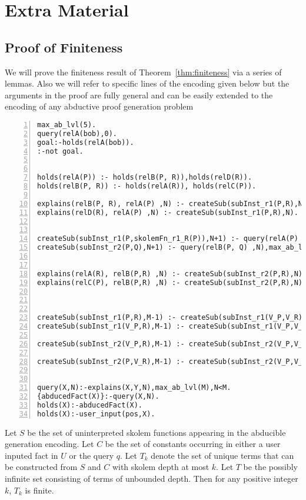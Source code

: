 \section{Extra Material}

\subsection{Proof of Finiteness}\label{sec:proof_finiteness}

We will prove the finiteness result of Theorem~\ref{thm:finiteness} via a series of lemmas. Also we will refer to specific lines of the encoding given below but the arguments in the proof are fully general and can be easily extended to the encoding of any abductive proof generation problem

\begin{lstlisting}[numbers=left]
max_ab_lvl(5).
query(relA(bob),0).
goal:-holds(relA(bob)).
:-not goal.


holds(relA(P)) :- holds(relB(P, R)),holds(relD(R)).
holds(relB(P, R)) :- holds(relA(R)), holds(relC(P)).

explains(relB(P, R), relA(P) ,N) :- createSub(subInst_r1(P,R),N).
explains(relD(R), relA(P) ,N) :- createSub(subInst_r1(P,R),N).


createSub(subInst_r1(P,skolemFn_r1_R(P)),N+1) :- query(relA(P) ,N),max_ab_lvl(M),N<M-1.
createSub(subInst_r2(P,Q),N+1) :- query(relB(P, Q) ,N),max_ab_lvl(M),N<M-1.


explains(relA(R), relB(P,R) ,N) :- createSub(subInst_r2(P,R),N).
explains(relC(P), relB(P,R) ,N) :- createSub(subInst_r2(P,R),N).



createSub(subInst_r1(P,R),M-1) :- createSub(subInst_r1(V_P,V_R),N), holds(relB(P, R)),max_ab_lvl(M).
createSub(subInst_r1(V_P,R),M-1) :- createSub(subInst_r1(V_P,V_R),N), holds(relD(R)),max_ab_lvl(M).

createSub(subInst_r2(V_P,R),M-1) :- createSub(subInst_r2(V_P,V_R),N), holds(relA(R)),max_ab_lvl(M).

createSub(subInst_r2(P,V_R),M-1) :- createSub(subInst_r2(V_P,V_R),N), holds(relC(P)),max_ab_lvl(M).


query(X,N):-explains(X,Y,N),max_ab_lvl(M),N<M.
{abducedFact(X)}:-query(X,N).
holds(X):-abducedFact(X).
holds(X):-user_input(pos,X).
\end{lstlisting}


\begin{lemma}
Let $S$ be the set of uninterpreted skolem functions appearing in the abducible
generation encoding. Let $C$ be the set of constants occurring in either a user
inputed fact in $U$ or the query $q$. Let $T_{k}$ denote the set of unique
terms that can be constructed from $S$ and $C$ with skolem depth at most
$k$. Let $T$  be the possibly infinite set consisting of terms of unbounded
depth. Then for any positive integer $k$, $T_{k}$ is finite.
\end{lemma}

